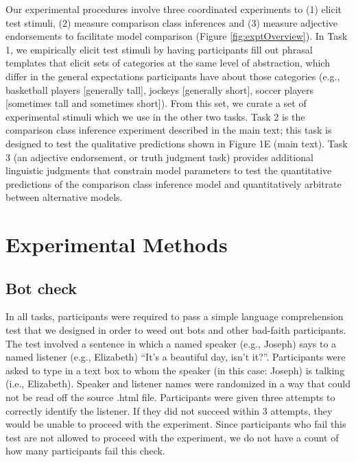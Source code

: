 \documentclass[doc]{apa6}
\begin{document}
Our experimental procedures involve three coordinated experiments to (1) elicit test stimuli, (2) measure comparison class inferences and (3) measure adjective endorsements to facilitate model comparison (Figure \ref{fig:exptOverview}). 
In Task 1, we empirically elicit test stimuli by having participants fill out phrasal templates that elicit sets of categories at the same level of abstraction, which differ in the general expectations participants have about those categories (e.g., basketball players [generally tall], jockeys [generally short], soccer players [sometimes tall and sometimes short]). 
From this set, we curate a set of experimental stimuli which we use in the other two tasks.
Task 2 is the comparison class inference experiment described in the main text; this task is designed to test the qualitative predictions shown in Figure 1E (main text).
Task 3 (an adjective endorsement, or truth judgment task) provides additional linguistic judgments that constrain model parameters to test the quantitative predictions of the comparison class inference model and quantitatively arbitrate between alternative models. 

\section{Experimental Methods}

\subsection{Bot check}

In all tasks, participants were required to pass a simple language comprehension test that we designed in order to weed out bots and other bad-faith participants. 
The test involved a sentence in which a named speaker (e.g., Joseph) says to a named listener (e.g., Elizabeth) ``It's a beautiful day, isn't it?''. 
Participants were asked to type in a text box to whom the speaker (in this case: Joseph) is talking (i.e., Elizabeth).
Speaker and listener names were randomized in a way that could not be read off the source .html file.
Participants were given three attempts to correctly identify the listener. 
If they did not succeed within 3 attempts, they would be unable to proceed with the experiment.
Since participants who fail this test are not allowed to proceed with the experiment, we do not have a count of how many participants fail this check.
\end{document}
